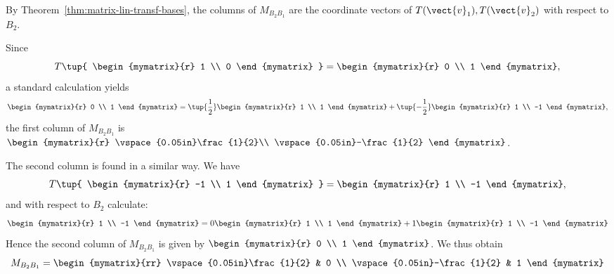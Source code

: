 \begin{solution}
By Theorem~\ref{thm:matrix-lin-transf-bases}, the columns of $M_{B_{2} B_{1}}$ are the
coordinate vectors of $T(\vect{v}_{1}), T(\vect{v}_{2})$ with respect
to $B_2$.

Since \[
T \tup{
\begin{mymatrix}{r}
1 \\
0
\end{mymatrix} }
= \begin{mymatrix}{r}
0 \\
1
\end{mymatrix} ,\]
a standard calculation yields 
\[
 \begin{mymatrix}{r}
0 \\
1
\end{mymatrix} 
 =  
\tup{\frac{1}{2} }\begin{mymatrix}{r}
1 \\
1
\end{mymatrix}
+
\tup{-\frac{1}{2} }
\begin{mymatrix}{r}
1 \\
-1
\end{mymatrix},
\]
the first column of $M_{B_{2} B_{1}}$ is $\begin{mymatrix}{r}
\vspace{0.05in}\frac{1}{2}\\
\vspace{0.05in}-\frac{1}{2}
\end{mymatrix}$. 

The second column is found in a similar way. We have 
\[
T \tup{
\begin{mymatrix}{r}
-1 \\
1
\end{mymatrix} }
= \begin{mymatrix}{r}
1 \\
-1
\end{mymatrix} , \]
and with respect to $B_2$ calculate:
\[ 
\begin{mymatrix}{r}
1 \\
-1
\end{mymatrix}
=
0 \begin{mymatrix}{r}
1 \\
1
\end{mymatrix}
+
1
\begin{mymatrix}{r}
1 \\
-1
\end{mymatrix}
\]
Hence the second column of $M_{B_{2} B_{1}}$ is given by $\begin{mymatrix}{r}
0 \\
1
\end{mymatrix}$. We thus obtain 
\[
M_{B_{2} B_{1}} = \begin{mymatrix}{rr}
\vspace{0.05in}\frac{1}{2} & 0 \\
\vspace{0.05in}-\frac{1}{2} & 1 
\end{mymatrix} \]


\end{solution}

